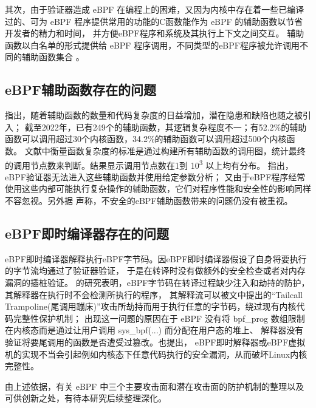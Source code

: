 \documentclass[12pt,a4paper]{article}
\begin{document}
\begin{sloppypar}
	其次，由于验证器造成 eBPF 在编程上的困难，又因为内核中存在着一些已编译过的、可为 eBPF
	程序提供常用的功能的C函数能作为 eBPF 的辅助函数以节省开发者的精力和时间\cite{FuzzOnEBPF}，
	并方便eBPF程序和系统及其执行上下文之间交互\cite{gbadamosiEBPFRuntimeLinux2024}。
	辅助函数以白名单的形式提供给 eBPF 程序调用，不同类型的eBPF程序被允许调用不同的辅助函数集合
	\cite{isovalentEBPFDocs2024, FuzzOnEBPF}。
	\subsection{eBPF辅助函数存在的问题}
	\textcite{jiaKernelExtensionVerification2023}指出，随着辅助函数的数量和代码复杂度的日益增加，潜在隐患和缺陷也随之被引入；
	截至2022年，已有249个的辅助函数，其逻辑复杂程度不一；有52.2\%的辅助函数可以调用超过30个内核函数，34.2\%的辅助函数可以调用超过500个内核函数。
	文献中衡量函数复杂度的标准是通过构建所有辅助函数的调用图，统计最终的调用节点数来判断。结果显示调用节点数在1到
	10\textsuperscript{3} 以上均有分布。
	\textcite[3]{sahuEnablingBPFRuntime2023}指出，eBPF验证器无法进入这些辅助函数并使用给定参数分析；
	又由于eBPF程序经常使用这些内部可能执行复杂操作的辅助函数，它们对程序性能和安全性的影响同样不容忽视。另外据
	\textcite[4]{jiaKernelExtensionVerification2023}声称，不安全的eBPF辅助函数带来的问题仍没有被重视。
	\subsection{eBPF即时编译器存在的问题}
	eBPF即时编译器解释执行eBPF字节码。因eBPF即时编译器假设了自身将要执行的字节流均通过了验证器验证，
	于是在转译时没有做额外的安全检查\cite{gershuniSimplePreciseStatic2019}或者对内存漏洞的插桩验证\cite[5]{sunFindingCorrectnessBugs2024}。
	\textcite{interpreterhijeck}的研究表明，eBPF字节码在转译过程缺少注入和劫持的防护，其解释器在执行时不会检测所执行的程序，
	其解释流可以被文中提出的“Tailcall Trampoline(尾调用蹦床)”攻击所劫持而用于执行任意的字节码，绕过现有内核代码完整性保护机制；
	出现这一问题的原因在于 eBPF 没有将 bpf\_prog 数组限制在内核态而是通过让用户调用 sys\_bpf(...) 而分配在用户态的堆上、
	解释器没有验证将要尾调用的函数是否遭受过篡改。\textcite[2]{ProofofJITeBPFvmForIoT}也提出，
	eBPF即时解释器或eBPF虚拟机的实现不当会引起例如内核态下任意代码执行的安全漏洞，从而破坏Linux内核完整性。

	由上述依据，有关 eBPF 中三个主要攻击面和潜在攻击面的防护机制的整理以及可供创新之处，有待本研究后续整理深化。


\end{sloppypar}
\end{document}
